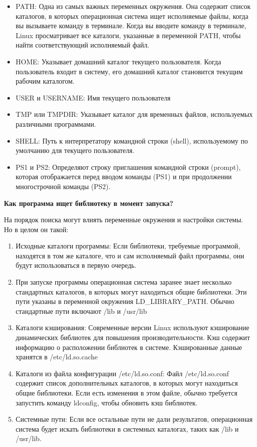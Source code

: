 \documentclass[oneside, final, 14pt]{extreport} %
\begin{document}
\begin{itemize}
    \item PATH: Одна из самых важных переменных окружения. Она содержит список каталогов, в которых операционная система ищет исполняемые файлы, когда вы вызываете команду в терминале. Когда вы вводите команду в терминале, Linux просматривает все каталоги, указанные в переменной PATH, чтобы найти соответствующий исполняемый файл.
    \item HOME: Указывает домашний каталог текущего пользователя. Когда пользователь входит в систему, его домашний каталог становится текущим рабочим каталогом.
    \item USER и USERNAME: Имя текущего пользователя
    \item TMP или TMPDIR: Указывает каталог для временных файлов, используемых различными программами.
    \item SHELL: Путь к интерпретатору командной строки (shell), используемому по умолчанию для текущего пользователя.
    \item PS1 и PS2: Определяют строку приглашения командной строки (prompt), которая отображается перед вводом команды (PS1) и при продолжении многострочной команды (PS2).
\end{itemize}

\vspace*{\baselineskip}

\textbf{Как программа ищет библиотеку в момент запуска?}

На порядок поиска могут влиять переменные окружения и настройки системы. Но в целом он такой:

\begin{enumerate}
    \item Исходные каталоги программы: Если библиотеки, требуемые программой, находятся в том же каталоге, что и сам исполняемый файл программы, они будут использоваться в первую очередь.
    \item При запуске программы операционная система заранее знает несколько стандартных каталогов, в которых могут находиться общие библиотеки. Эти пути указаны в переменной окружения LD\_LIBRARY\_PATH. Обычно стандартные пути включают /lib и /usr/lib
    \item Каталоги кэширования: Современные версии Linux используют кэширование динамических библиотек для повышения производительности. Кэш содержит информацию о расположении библиотек в системе. Кэшированные данные хранятся в /etc/ld.so.cache
    \item Каталоги из файла конфигурации /etc/ld.so.conf: Файл /etc/ld.so.conf содержит список дополнительных каталогов, в которых могут находиться общие библиотеки. Если есть изменения в этом файле, обычно требуется запустить команду ldconfig, чтобы обновить кэш библиотек.
    \item Системные пути: Если все остальные пути не дали результатов, операционная система будет искать библиотеки в системных каталогах, таких как /lib и /usr/lib.
\end{enumerate}
\end{document}
